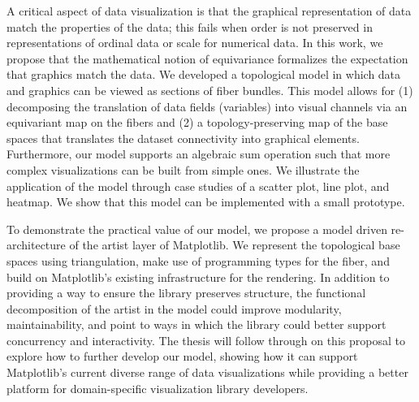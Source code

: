  A critical aspect of data visualization is that the graphical representation of data match the properties of the data; this fails when order is not preserved in representations of ordinal data or scale for numerical data. In this work, we propose that the mathematical notion of equivariance formalizes the expectation that graphics match the data. We developed a topological model in which data and graphics can be viewed as sections of fiber bundles. This model allows for (1) decomposing the translation of data fields (variables) into visual channels via an equivariant map on the fibers and (2) a topology-preserving map of the base spaces that translates the dataset connectivity into graphical elements. Furthermore, our model supports an algebraic sum operation such that more complex visualizations can be built from simple ones. We illustrate the application of the model through case studies of a scatter plot, line plot, and heatmap. We show that this model can be implemented with a small prototype.

 To demonstrate the practical value of our model, we propose a model driven re-architecture of the artist layer of Matplotlib. We represent the topological base spaces using triangulation, make use of programming types for the fiber, and build on Matplotlib's existing infrastructure for the rendering. In addition to providing a way to ensure the library preserves structure, the functional decomposition of the artist in the model could improve modularity, maintainability, and point to ways in which the library could better support concurrency and interactivity. The thesis will follow through on this proposal to explore how to further develop our model, showing how it can support Matplotlib's current diverse range of data visualizations while providing a better platform for domain-specific visualization library developers.
